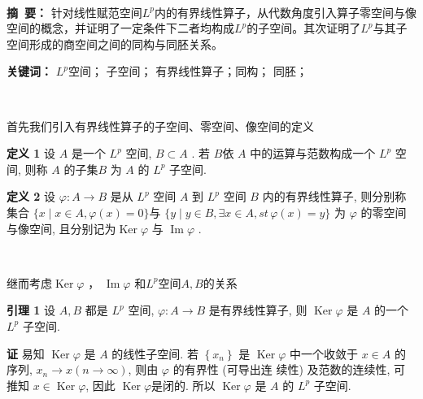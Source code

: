 \documentclass[12pt,a4paper,UTF8]{ctexart}
\begin{document}

\begin{center}
  \LARGE{}\par
  \par
\end{center}
\begin{spacing}{0.7}
	~
\end{spacing}
\noindent \textbf{摘~要：} 针对线性赋范空间$L^p$内的有界线性算子，从代数角度引入算子零空间与像空间的概念，并证明了一定条件下二者均构成$L^p$的子空间。其次证明了$L^p$与其子空间形成的商空间之间的同构与同胚关系。

\noindent \textbf{关键词：} $L^p$空间；  子空间； 有界线性算子；同构； 同胚；
\begin{spacing}{1.3}
	~
\end{spacing} 

首先我们引入有界线性算子的子空间、零空间、像空间的定义

\textbf{定义 1} 设  $A $ 是一个 $ L^{p} $ 空间,  $B \subset A$ . 若 $B $依 $A $ 中的运算与范数构成一个  $L^{p}$  空间, 则称 $ A$  的子集$  B$  为 $A$  的 $ L^{p}$  子空间.

\textbf{定义 2 }设 $ \varphi: A \rightarrow B$  是从 $ L^{p} $ 空间  $A$  到  $L^{p}$  空间 $ B $ 内的有界线性算子, 则分别称集合
$\{x \mid x \in A, \varphi(x)=0\}$与 $ \{y \mid y \in B, \exists x \in A  ,st \, \varphi(x)=y\} $
为 $ \varphi $ 的零空间与像空间, 且分别记为$  \operatorname{Ker} \varphi $ 与  $\operatorname{Im} \varphi$ .


~\par

继而考虑$  \operatorname{Ker} \varphi $ ，  $\operatorname{Im} \varphi$ 和$L^p$空间$A,B$的关系

\textbf{引理 1} 设  $A, B $ 都是 $ L^{p} $ 空间,  $\varphi: A \rightarrow B $ 是有界线性算子, 则  $\operatorname{Ker} \varphi $ 是 $ A$  的一个 $ L^{p} $ 子空间. 

\textbf{证 } 易知  $\operatorname{Ker} \varphi$  是 $ A $ 的线性子空间.
若 $ \left\{x_{n}\right\} $ 是 $ \operatorname{Ker} \varphi $ 中一个收敛于  $x \in A $ 的序列, $ x_{n} \rightarrow x(n \rightarrow \infty) $, 则由 $ \varphi $ 的有界性 (可导出连 续性) 及范数的连续性, 可推知  $x \in \operatorname{Ker} \varphi $, 因此 $ \operatorname{Ker} \varphi  $是闭的. 所以 $ \operatorname{Ker} \varphi $ 是  $A$  的  $L^{p}$  子空间.
\end{document}
